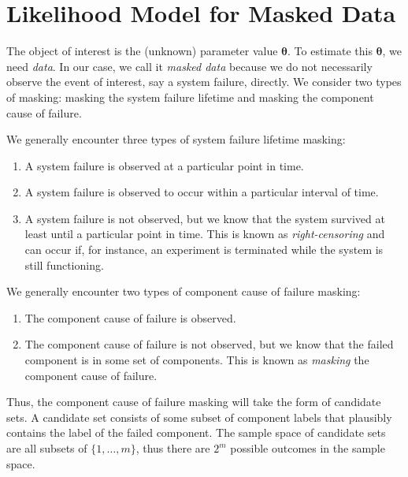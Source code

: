 \documentclass[
]{article}
\providecommand{\tightlist}{%
  \setlength{\itemsep}{0pt}\setlength{\parskip}{0pt}}
\begin{document}
\hypertarget{sec:like_model}{%
\section{Likelihood Model for Masked Data}\label{sec:like_model}}

The object of interest is the (unknown) parameter value
\(\boldsymbol{\theta}\). To estimate this \(\boldsymbol{\theta}\), we
need \emph{data}. In our case, we call it \emph{masked data} because we
do not necessarily observe the event of interest, say a system failure,
directly. We consider two types of masking: masking the system failure
lifetime and masking the component cause of failure.

We generally encounter three types of system failure lifetime masking:

\begin{enumerate}
\def\labelenumi{\arabic{enumi}.}
\tightlist
\item
  A system failure is observed at a particular point in time.
\item
  A system failure is observed to occur within a particular interval of
  time.
\item
  A system failure is not observed, but we know that the system survived
  at least until a particular point in time. This is known as
  \emph{right-censoring} and can occur if, for instance, an experiment
  is terminated while the system is still functioning.
\end{enumerate}

We generally encounter two types of component cause of failure masking:

\begin{enumerate}
\def\labelenumi{\arabic{enumi}.}
\tightlist
\item
  The component cause of failure is observed.
\item
  The component cause of failure is not observed, but we know that the
  failed component is in some set of components. This is known as
  \emph{masking} the component cause of failure.
\end{enumerate}

Thus, the component cause of failure masking will take the form of
candidate sets. A candidate set consists of some subset of component
labels that plausibly contains the label of the failed component. The
sample space of candidate sets are all subsets of \(\{1,\ldots,m\}\),
thus there are \(2^m\) possible outcomes in the sample space.
\end{document}
